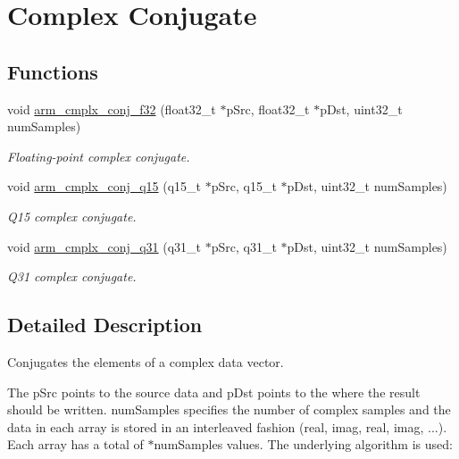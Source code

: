 \hypertarget{group__cmplx__conj}{\section{Complex Conjugate}
\label{group__cmplx__conj}
}
\subsection*{Functions}
\begin{DoxyCompactItemize}
\item 
void \hyperlink{group__cmplx__conj_ga3a102aead6460ad9fcb0626f6b226ffb}{arm\-\_\-cmplx\-\_\-conj\-\_\-f32} (float32\-\_\-t $\ast$p\-Src, float32\-\_\-t $\ast$p\-Dst, uint32\-\_\-t num\-Samples)
\begin{DoxyCompactList}\small\item\em Floating-\/point complex conjugate. \end{DoxyCompactList}\item 
void \hyperlink{group__cmplx__conj_gaf47689ae07962acaecb8ddde556df4a4}{arm\-\_\-cmplx\-\_\-conj\-\_\-q15} (q15\-\_\-t $\ast$p\-Src, q15\-\_\-t $\ast$p\-Dst, uint32\-\_\-t num\-Samples)
\begin{DoxyCompactList}\small\item\em Q15 complex conjugate. \end{DoxyCompactList}\item 
void \hyperlink{group__cmplx__conj_gafecc94879a383c5208ec3ef99485e4b5}{arm\-\_\-cmplx\-\_\-conj\-\_\-q31} (q31\-\_\-t $\ast$p\-Src, q31\-\_\-t $\ast$p\-Dst, uint32\-\_\-t num\-Samples)
\begin{DoxyCompactList}\small\item\em Q31 complex conjugate. \end{DoxyCompactList}\end{DoxyCompactItemize}


\subsection{Detailed Description}
Conjugates the elements of a complex data vector.

The {\ttfamily p\-Src} points to the source data and {\ttfamily p\-Dst} points to the where the result should be written. {\ttfamily num\-Samples} specifies the number of complex samples and the data in each array is stored in an interleaved fashion (real, imag, real, imag, ...). Each array has a total of {$\ast$num\-Samples} values. The underlying algorithm is used\-:


